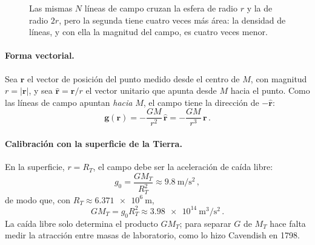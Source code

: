 \begin{figure}[htbp]
  \centering
  \caption{Las mismas $N$ líneas de campo cruzan la esfera de radio $r$ y la de
    radio $2r$, pero la segunda tiene cuatro veces más área: la densidad de
    líneas, y con ella la magnitud del campo, es cuatro veces menor.}
  \label{fig:lineas_campo_esferas}
\end{figure}

\paragraph{Forma vectorial.}
Sea $\boldsymbol{r}$ el vector de posición del punto medido desde el centro de
$M$, con magnitud $r = \lvert\boldsymbol{r}\rvert$, y sea
$\hat{\boldsymbol{r}} = \boldsymbol{r}/r$ el vector unitario que apunta desde
$M$ hacia el punto. Como las líneas de campo apuntan \emph{hacia} $M$, el
campo tiene la dirección de $-\hat{\boldsymbol{r}}$:
\begin{equation}
  \boxed{\boldsymbol{g}(\boldsymbol{r})
    = -\frac{G M}{r^{2}}\,\hat{\boldsymbol{r}}
    = -\frac{G M}{r^{3}}\,\boldsymbol{r}} \,.
  \label{eq:campo_g_vectorial}
\end{equation}

\paragraph{Calibración con la superficie de la Tierra.}
En la superficie, $r = R_T$, el campo debe ser la aceleración de caída libre:
\begin{equation}
  g_0 = \frac{G M_T}{R_T^{2}} \approx \SI{9.8}{\meter\per\second\squared} \,,
  \label{eq:calibracion_g0}
\end{equation}
de modo que, con $R_T \approx \SI{6.371e6}{\meter}$,
\begin{equation}
  G M_T = g_0 R_T^{2}
  \approx \SI{3.98e14}{\meter\cubed\per\second\squared} \,.
  \label{eq:calibracion_GM}
\end{equation}
La caída libre solo determina el producto $G M_T$; para separar $G$ de $M_T$
hace falta medir la atracción entre masas de laboratorio, como lo hizo
Cavendish en 1798.

